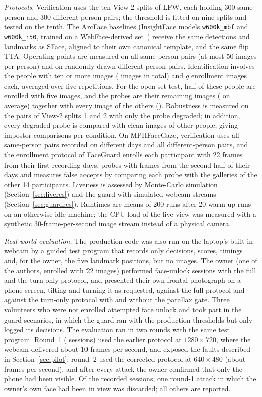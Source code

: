 \documentclass[journal]{IEEEtran}
\newcommand{\sys}{FaceGuard}
\begin{document}
\emph{Protocols.} Verification uses the ten View-2 splits of LFW, each holding 300 same-person and 300 different-person pairs; the threshold is fitted on nine splits and tested on the tenth. The ArcFace baselines (InsightFace models \texttt{w600k\_mbf} and \texttt{w600k\_r50}, trained on a WebFace-derived set~\cite{zhu2021webface260m}) receive the same detections and landmarks as SFace, aligned to their own canonical template, and the same flip TTA. Operating points are measured on all \opGenuine{} same-person pairs (at most 50 images per person) and on \opImpostor{} randomly drawn different-person pairs. Identification involves the \idPeople{} people with ten or more images (\idImages{} images in total) and $g$ enrollment images each, averaged over five repetitions. For the open-set test, half of these people are enrolled with five images, and the probes are their remaining images (\osKnown{} on average) together with every image of the others (\osUnknown{}). Robustness is measured on the \robPairs{} pairs of View-2 splits 1 and 2 with only the probe degraded; in addition, every degraded probe is compared with \robImpGallery{} clean images of other people, giving \robImpN{} impostor comparisons per condition. On MPIIFaceGaze, verification uses all same-person pairs recorded on different days and all different-person pairs, and the enrollment protocol of \sys{} enrolls each participant with 22 frames from their first recording days, probes with frames from the second half of their days and measures false accepts by comparing each probe with the galleries of the other 14 participants. Liveness is assessed by Monte-Carlo simulation (Section~\ref{sec:liveres}) and the guard with simulated webcam streams (Section~\ref{sec:guardres}). Runtimes are means of 200 runs after 20 warm-up runs on an otherwise idle machine; the CPU load of the live view was measured with a synthetic 30-frame-per-second image stream instead of a physical camera.

\emph{Real-world evaluation.} The production code was also run on the laptop's built-in webcam by a guided test program that records only decisions, scores, timings and, for the owner, the five landmark positions, but no images. The owner (one of the authors, enrolled with 22 images) performed face-unlock sessions with the full and the turn-only protocol, and presented their own frontal photograph on a phone screen, tilting and turning it as requested, against the full protocol and against the turn-only protocol with and without the parallax gate. Three volunteers who were not enrolled attempted face unlock and took part in the guard scenarios, in which the guard ran with the production thresholds but only logged its decisions. The evaluation ran in two rounds with the same test program. Round~1 (\rwPilotTrials{} sessions) used the earlier protocol at $1280\times720$, where the webcam delivered about 10 frames per second, and exposed the faults described in Section~\ref{sec:pilot}; round~2 used the corrected protocol at $640\times480$ (about \rwFps{} frames per second), and after every attack the owner confirmed that only the phone had been visible. Of the \rwAllSessions{} recorded sessions, one round-1 attack in which the owner's own face had been in view was discarded; all others are reported.
\end{document}
